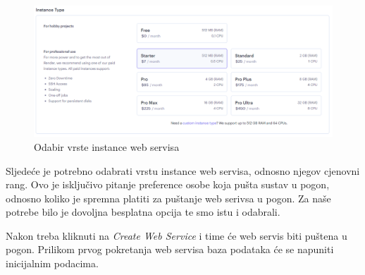 			\begin{figure}[H]
				\includegraphics[width=\textwidth]{slike/upute/webServisPlacanje.png} %
				\caption{Odabir vrste instance web servisa}
				\label{fig:webServisPlacanje} %
			\end{figure}
			
			Sljedeće je potrebno odabrati vrstu instance web servisa, odnosno njegov cjenovni rang. Ovo je isključivo pitanje preference osobe koja pušta sustav u pogon, odnosno koliko je spremna platiti za puštanje web serivsa u pogon. Za naše potrebe bilo je dovoljna besplatna opcija te smo istu i odabrali.
			
			Nakon treba kliknuti na \textit{Create Web Service} i time će web servis biti puštena u pogon. Prilikom prvog pokretanja web servisa baza podataka će se napuniti inicijalnim podacima.
			
